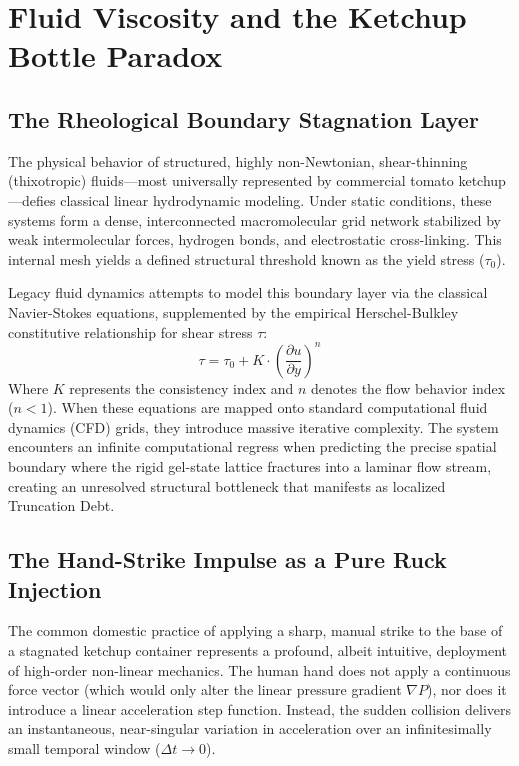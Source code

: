 \documentclass[11pt,a4paper]{article}
\begin{document}
\section{Fluid Viscosity and the Ketchup Bottle Paradox}

\subsection{The Rheological Boundary Stagnation Layer}
The physical behavior of structured, highly non-Newtonian, shear-thinning (thixotropic) fluids—most universally represented by commercial tomato ketchup—defies classical linear hydrodynamic modeling. Under static conditions, these systems form a dense, interconnected macromolecular grid network stabilized by weak intermolecular forces, hydrogen bonds, and electrostatic cross-linking. This internal mesh yields a defined structural threshold known as the yield stress ($\tau_0$). 

Legacy fluid dynamics attempts to model this boundary layer via the classical Navier-Stokes equations, supplemented by the empirical Herschel-Bulkley constitutive relationship for shear stress $\tau$:
\begin{equation}
    \tau = \tau_0 + K \cdot \left( \frac{\partial u}{\partial y} \right)^n
\end{equation}
Where $K$ represents the consistency index and $n$ denotes the flow behavior index ($n < 1$). When these equations are mapped onto standard computational fluid dynamics (CFD) grids, they introduce massive iterative complexity. The system encounters an infinite computational regress when predicting the precise spatial boundary where the rigid gel-state lattice fractures into a laminar flow stream, creating an unresolved structural bottleneck that manifests as localized Truncation Debt.

\subsection{The Hand-Strike Impulse as a Pure Ruck Injection}
The common domestic practice of applying a sharp, manual strike to the base of a stagnated ketchup container represents a profound, albeit intuitive, deployment of high-order non-linear mechanics. The human hand does not apply a continuous force vector (which would only alter the linear pressure gradient $\nabla P$), nor does it introduce a linear acceleration step function. Instead, the sudden collision delivers an instantaneous, near-singular variation in acceleration over an infinitesimally small temporal window ($\Delta t \to 0$).
\end{document}
